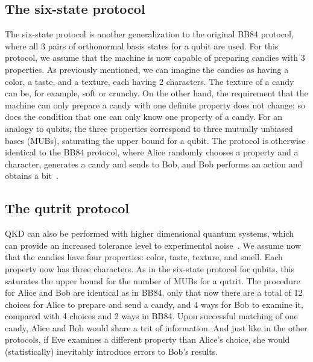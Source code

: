 \documentclass{article}
\begin{document}
\subsection{The six-state protocol}
The six-state protocol is another generalization to the original BB84 protocol, where all 3 pairs of orthonormal basis states for a qubit are used.
For this protocol, we assume that the machine is now capable of preparing candies with 3 properties.
As previously mentioned, we can imagine the candies as having a color, a taste, and a texture, each having 2 characters.
The texture of a candy can be, for example, soft or crunchy.
On the other hand, the requirement that the machine can only prepare a candy with one definite property does not change; so does the condition that one can only know one property of a candy.
For an analogy to qubits, the three properties correspond to three mutually unbiased bases (MUBs), saturating the upper bound for a qubit.
The protocol is otherwise identical to the BB84 protocol, where Alice randomly chooses a property and a character, generates a candy and sends to Bob, and Bob performs an action and obtains a bit~\cite{kato2016security}.


\subsection{The qutrit protocol}
QKD can also be performed with higher dimensional quantum systems, which can provide an increased tolerance level to experimental noise~\cite{bechmann2000quantum}.
We assume now that the candies have four properties: color, taste, texture, and smell.
Each property now has three characters.
As in the six-state protocol for qubits, this saturates the upper bound for the number of MUBs for a qutrit.
The procedure for Alice and Bob are identical as in BB84, only that now there are a total of 12 choices for Alice to prepare and send a candy, and 4 ways for Bob to examine it, compared with 4 choices and 2 ways in BB84.
Upon successful matching of one candy, Alice and Bob would share a trit of information.
And just like in the other protocols, if Eve examines a different property than Alice's choice, she would (statistically) inevitably introduce errors to Bob's results.
\end{document}
